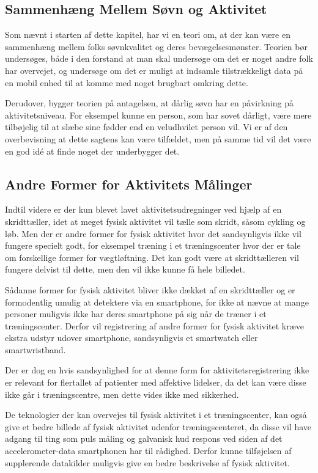 \subsection{Sammenhæng Mellem Søvn og Aktivitet}
Som nævnt i starten af dette kapitel, har vi en teori om, at der kan være en sammenhæng mellem folks søvnkvalitet og deres bevægelsesmønster.
Teorien bør undersøges, både i den forstand at man skal undersøge om det er noget andre folk har overvejet, og undersøge om det er muligt at indsamle tilstrækkeligt data på en mobil enhed til at komme med noget brugbart omkring dette.

Derudover, bygger teorien på antagelsen, at dårlig søvn har en påvirkning på aktivitetsniveau.
For eksempel kunne en person, som har sovet dårligt, være mere tilbøjelig til at slæbe sine fødder end en veludhvilet person vil.
Vi er af den overbevisning at dette sagtens kan være tilfældet, men på samme tid vil det være en god idé at finde noget der underbygger det.

\subsection{Andre Former for Aktivitets Målinger}
Indtil videre er der kun blevet lavet aktivitetsudregninger ved hjælp af en skridttæller, idet at meget fysisk aktivitet vil tælle som skridt, såsom cykling og løb. 
Men der er andre former for fysisk aktivitet hvor det sandsynligvis ikke vil fungere specielt godt, for eksempel træning i et træningscenter hvor der er tale om forskellige former for vægtløftning. 
Det kan godt være at skridttælleren vil fungere delvist til dette, men den vil ikke kunne få hele billedet.

Sådanne former for fysisk aktivitet bliver ikke dækket af en skridttæller og er formodentlig umulig at detektere via en smartphone, for ikke at nævne at mange personer muligvis ikke har deres smartphone på sig når de træner i et træningscenter.
Derfor vil registrering af andre former for fysisk aktivitet kræve ekstra udstyr udover smartphone, sandsynligvis et smartwatch eller smartwristband.

Der er dog en hvis sandsynlighed for at denne form for aktivitetsregistrering ikke er relevant for flertallet af patienter med affektive lidelser, da det kan være disse ikke går i træningscentre, men dette vides ikke med sikkerhed.

De teknologier der kan overvejes til fysisk aktivitet i et træningscenter, kan også give et bedre billede af fysisk aktivitet udenfor træningscenteret, da disse vil have adgang til ting som puls måling og galvanisk hud respons ved siden af det accelerometer-data smartphonen har til rådighed.
Derfor kunne tilføjelsen af supplerende datakilder muligvis give en bedre beskrivelse af fysisk aktivitet.